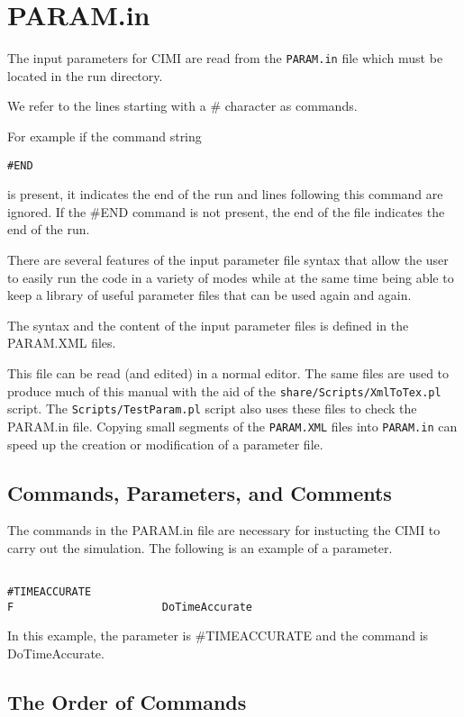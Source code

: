
\section{PARAM.in \label{section:param.in}}

The input parameters for CIMI are read from the 
{\tt PARAM.in} file which must be located in the run directory.

We refer to the lines starting with a \# character as commands.

For example if the command string 
\begin{verbatim}
#END
\end{verbatim}
is present, it indicates the end of the run and lines following
this command are ignored. If the \#END command is not
present, the end of the file indicates the end of the run.

There are several features of the input parameter file syntax
that allow the user to easily run the code
in a variety of modes while at the same time being able to 
keep a library of useful parameter files that can be used
again and again.

The syntax and the content of the input parameter files
is defined in the PARAM.XML files. 

This file can be read (and edited) in a normal editor.
The same files are used to produce much of this
manual with the aid of the {\tt share/Scripts/XmlToTex.pl} script. 
The {\tt Scripts/TestParam.pl} script also uses these files
to check the PARAM.in file.
Copying small segments of the {\tt PARAM.XML} files
into {\tt PARAM.in} can speed up the creation or modification of a 
parameter file. 

\subsection{Commands, Parameters, and Comments \label{section:commands}}

The commands in the PARAM.in file are necessary for instucting the CIMI 
to carry out the simulation. The following is an example of a parameter.
\begin{verbatim}

#TIMEACCURATE
F                       DoTimeAccurate

\end{verbatim}
In this example, the parameter is \#TIMEACCURATE and the command is 
DoTimeAccurate.
  
\subsection{The Order of Commands \label{section:order}}

